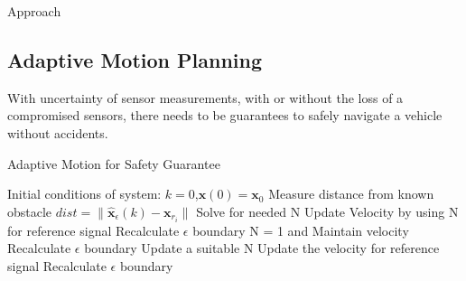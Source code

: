 \begin{section}{Approach}
\subsection{Adaptive Motion Planning}
With uncertainty of sensor measurements, with or without the loss of a compromised sensors, there needs to be guarantees to safely navigate a vehicle without accidents.



\begin{algorithm}
   \caption{Adaptive Motion for Safety Guarantee} 
   \label{alg:adapt_motion} 
    \begin{algorithmic}[1]
	\State Initial conditions of system: $k=0$,$\bm{x}(0)=\bm{x}_0$
        \State Measure distance from known obstacle $dist =\|\hat{\bm{x}}_\epsilon(k)-\bm{x}_{r_i}\|$
            \State Solve for needed N
            \State Update Velocity by using N for reference signal
            \State Recalculate $\epsilon$ boundary
        \Else
                \State N = 1 and Maintain velocity
                \State Recalculate $\epsilon$ boundary
            \Else
                \State Update a suitable N
                \State Update the velocity for reference signal
                \State Recalculate $\epsilon$ boundary
            \EndIf
        \EndIf
    \EndWhile
	\end{algorithmic}
\end{algorithm}



\end{section} 